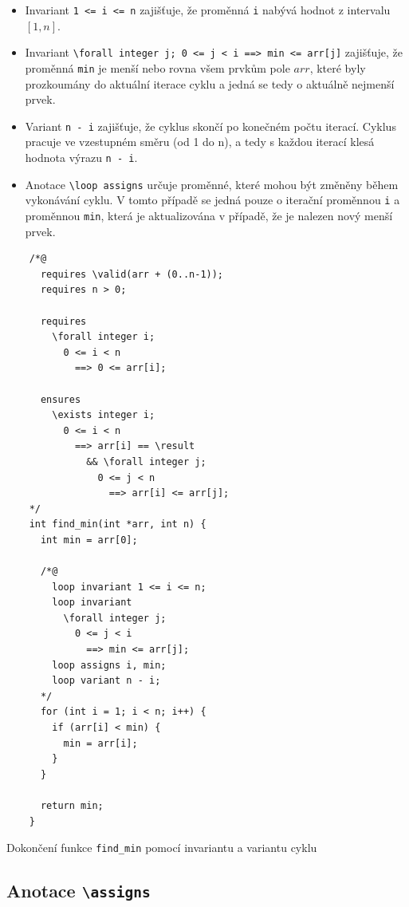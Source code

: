 \begin{itemize}
    \item Invariant \texttt{1 <= i <= n} zajišťuje, že proměnná \texttt{i} nabývá hodnot z intervalu $[1, n]$.
    \item Invariant \texttt{\textbackslash forall integer j; 0 <= j < i ==> min <= arr[j]} zajišťuje,
          že proměnná \texttt{min} je menší nebo rovna všem prvkům pole $arr$,
          které byly prozkoumány do aktuální iterace cyklu a jedná se tedy o aktuálně nejmenší prvek.
    \item Variant \texttt{n - i} zajišťuje, že cyklus skončí po konečném počtu iterací.
          Cyklus pracuje ve vzestupném směru (od 1 do n),
          a tedy s každou iterací klesá hodnota výrazu \texttt{n - i}.
    \item Anotace \texttt{\textbackslash loop assigns} určuje proměnné, které mohou být změněny během vykonávání cyklu.
          V tomto případě se jedná pouze o iterační proměnnou \texttt{i} a proměnnou \texttt{min},
          která je aktualizována v případě, že je nalezen nový menší prvek.
\end{itemize}

\begin{listing}[H]
    \begin{verbatim}
    /*@
      requires \valid(arr + (0..n-1));
      requires n > 0;

      requires
        \forall integer i;
          0 <= i < n
            ==> 0 <= arr[i];

      ensures
        \exists integer i;
          0 <= i < n
            ==> arr[i] == \result
              && \forall integer j;
                0 <= j < n
                  ==> arr[i] <= arr[j];
    */
    int find_min(int *arr, int n) {
      int min = arr[0];

      /*@
        loop invariant 1 <= i <= n;
        loop invariant
          \forall integer j;
            0 <= j < i
              ==> min <= arr[j];
        loop assigns i, min;
        loop variant n - i;
      */
      for (int i = 1; i < n; i++) {
        if (arr[i] < min) {
          min = arr[i];
        }
      }

      return min;
    }
    \end{verbatim}
    \caption{Dokončení funkce \texttt{find\_min} pomocí invariantu a variantu cyklu}
    \label{list:find-min-complete}
\end{listing}


\subsection{Anotace \texttt{\textbackslash assigns}}
\label{subsec:acsl-anotace-assigns}

